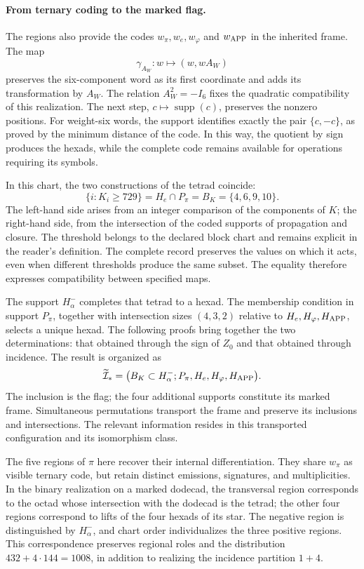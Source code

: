 \paragraph{From ternary coding to the marked flag.}
\label{inc-ampl-bandera}
The regions also provide the codes $w_\pi,w_e,w_\varphi$ and
$w_{\rm APP}$ in the inherited frame. The map
\[
 \gamma_{A_W}:w\longmapsto(w,wA_W)
\]
preserves the six-component word as its first coordinate and adds
its transformation by $A_W$. The relation $A_W^2=-I_6$ fixes
the quadratic compatibility of this realization. The next step,
$c\mapsto\operatorname{supp}(c)$, preserves the nonzero positions.
For weight-six words, the support identifies exactly the pair
$\{c,-c\}$, as proved by the minimum distance of the code. In this way,
the quotient by sign produces the hexads, while the complete code
remains available for operations requiring its symbols.

In this chart, the two constructions of the tetrad coincide:
\begin{equation}
 \{i:K_i\geq729\}
 =H_e\cap P_\pi=B_K=\{4,6,9,10\}.
 \label{inc-ampl-cuaterna}
\end{equation}
The left-hand side arises from an integer comparison of the components
of $K$; the right-hand side, from the intersection of the coded supports of
propagation and closure. The threshold belongs to the declared block
chart and remains explicit in the reader's definition. The
complete record preserves the values on which it acts, even when
different thresholds produce the same subset. The equality therefore
expresses compatibility between specified maps.

The support $H^-_\alpha$ completes that tetrad to a hexad.
The membership condition in support $P_\pi$, together with intersection
sizes $(4,3,2)$ relative to $H_e,H_\varphi,H_{\rm APP}$,
selects a unique hexad. The following proofs bring together the two
determinations: that obtained through the sign of $Z_0$ and that obtained
through incidence. The result is organized as
\begin{equation}
 \widetilde{\mathcal I}_*
 =\bigl(B_K\subset H^-_\alpha;
         P_\pi,H_e,H_\varphi,H_{\rm APP}\bigr).
 \label{inc-ampl-marco}
\end{equation}
The inclusion is the flag; the four additional supports constitute
its marked frame. Simultaneous permutations transport the frame and
preserve its inclusions and intersections. The relevant information resides
in this transported configuration and its isomorphism class.

The five regions of $\pi$ here recover their internal differentiation.
They share $w_\pi$ as visible ternary code, but retain distinct emissions,
signatures, and multiplicities. In the binary realization on a
marked dodecad, the transversal region corresponds to the octad whose
intersection with the dodecad is the tetrad; the other four regions
correspond to lifts of the four hexads of its star. The
negative region is distinguished by $H^-_\alpha$, and chart order
individualizes the three positive regions. This correspondence preserves
regional roles and the distribution $432+4\cdot144=1008$, in addition
to realizing the incidence partition $1+4$.
